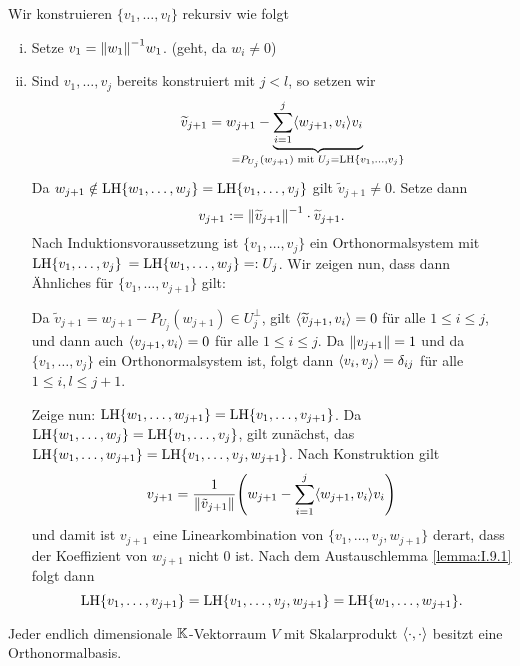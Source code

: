\begin{beweis}
	Wir konstruieren $\{v_1,\dots,v_l\}$ rekursiv wie folgt
	\begin{enumerate}[(i)]
		\item Setze $v_1 = \no{w_1}^{-1} w_1$. (geht, da $w_i \neq 0$)
		\item Sind $v_1,\dots,v_j$ bereits konstruiert mit $j < l$, so setzen wir
		\[
			\widetilde{v}_{j+1} = w_{j+1} - \Underbrace{\sum_{i=1}^{j} \sk{w_{j+1},v_i} v_i}{\mathclap{=P_{U_j}(w_{j+1}) \text{ mit } U_j = \LH\{v_1,\dots,v_j\}}}
		\]
		Da $w_{j+1} \notin \operatorname{LH}\{w_1,\dots,w_j\} = \operatorname{LH}\{v_1,\dots,v_j\}$ gilt $\widetilde{v}_{j+1} \neq 0$.
		Setze dann
		\[
			v_{j+1} := \left\lVert\widetilde{v}_{j+1}\right\rVert^{-1} \cdot \widetilde{v}_{j+1}.
		\]
		Nach Induktionsvoraussetzung ist $\{v_1,\dots,v_j\}$ ein Orthonormalsystem mit $\operatorname{LH}\{v_1,\dots,v_j\}$ \linebreak $= \operatorname{LH}\{w_1,\dots,w_j\} =: U_j$.
		Wir zeigen nun, dass dann Ähnliches für $\{v_1,\dots,v_{j+1}\}$ gilt:
		
		Da $\widetilde{v}_{j+1} = w_{j+1} - P_{U_j}(w_{j+1}) \in U_j^\perp$, gilt $\left\langle\widetilde{v}_{j+1},v_i\right\rangle = 0$ für alle $1 \leq i \leq j$, und dann auch $\left\langle v_{j+1},v_i\right\rangle = 0$ für alle $1 \leq i \leq j$.
		Da $\left\lVert v_{j+1}\right\rVert = 1$ und da $\{v_1,\dots,v_j\}$ ein Orthonormalsystem ist, folgt dann $\left\langle v_i,v_j\right\rangle = \delta_{ij}$ für alle $1 \leq i,l \leq  j+1$.
		
		Zeige nun: $\operatorname{LH}\{w_1,\dots,w_{j+1}\} = \operatorname{LH}\{v_1,\dots,v_{j+1}\}$.
		Da $\operatorname{LH}\{w_1,\dots,w_j\} = \operatorname{LH}\{v_1,\dots,v_j\}$, gilt zunächst, das $\operatorname{LH}\{w_1,\dots,w_{j+1}\} = \operatorname{LH}\{v_1,\dots,v_j,w_{j+1}\}$.
		Nach Konstruktion gilt
		\[
			v_{j+1} = \frac{1}{\no{\tilde{v}_{j+1}}} \enb{w_{j+1} - \sum_{i=1}^{j} \sk{w_{j+1},v_i} v_i}
		\]
		und damit ist $v_{j+1}$ eine Linearkombination von $\{v_1,\dots,v_j,w_{j+1}\}$ derart, dass der Koeffizient von $w_{j+1}$ nicht $0$ ist.
		Nach dem Austauschlemma \ref{lemma:I.9.1} folgt dann
		\[
			\operatorname{LH}\{v_1,\dots,v_{j+1}\} = \operatorname{LH}\{v_1,\dots,v_j,w_{j+1}\} = \operatorname{LH}\{w_1,\dots,w_{j+1}\}. 
		\]
	\end{enumerate}
\end{beweis}

\begin{korollar}
	\label{kor:4.14}
	Jeder endlich dimensionale $\mathbb{K}$-Vektorraum $V$ mit Skalarprodukt $\left\langle\cdot,\cdot\right\rangle$ besitzt eine Orthonormalbasis.
\end{korollar}

